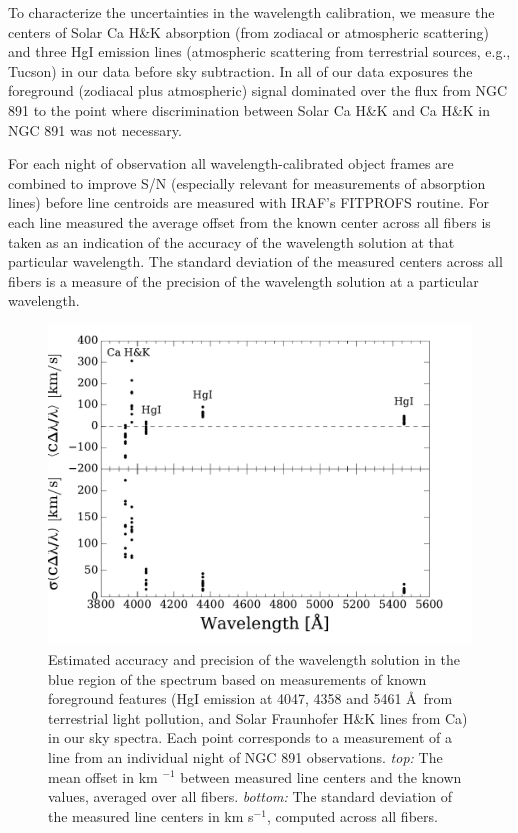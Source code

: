 To characterize the uncertainties in the wavelength calibration, we
measure the centers of Solar Ca H\&K absorption (from zodiacal or
atmospheric scattering) and three HgI emission lines (atmospheric
scattering from terrestrial sources, e.g., Tucson) in our data before
sky subtraction. In all of our data exposures the foreground (zodiacal
plus atmospheric) signal dominated over the flux from NGC 891 to the
point where discrimination between Solar Ca H\&K and Ca H\&K in NGC
891 was not necessary.

For each night of observation all wavelength-calibrated object frames
are combined to improve S/N (especially relevant for measurements of
absorption lines) before line centroids are measured with IRAF's
FITPROFS routine. For each line measured the average offset from the
known center across all \GP fibers is taken as an indication of the
accuracy of the wavelength solution at that particular wavelength. The
standard deviation of the measured centers across all \GP fibers is a
measure of the precision of the wavelength solution at a particular
wavelength.

\begin{figure}
  \centering
  \includegraphics[width=\columnwidth]{891_1/figs/Wave_Err_comb.pdf}
  \caption{\label{fig:wave_err}\fixspacing Estimated accuracy and
    precision of the wavelength solution in the blue region of the
    spectrum based on measurements of known foreground features (HgI
    emission at 4047, 4358 and 5461 \AA\ from terrestrial light
    pollution, and Solar Fraunhofer H\&K lines from Ca) in our sky
    spectra.  Each point corresponds to a measurement of a line from
    an individual night of NGC 891 observations. \emph{top:} The mean
    offset in km $^{-1}$ between measured line centers and the known
    values, averaged over all \GP fibers. \emph{bottom:} The standard
    deviation of the measured line centers in km s$^{-1}$, computed
    across all \GP fibers.}
\end{figure}

